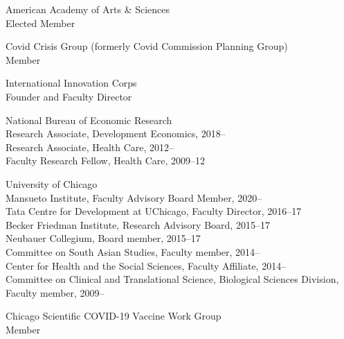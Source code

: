 \documentclass[11pt,letterpaper]{report}
\begin{document}
    \begin{tablist}
    
        \item[2021--]   \tab{}American Academy of Arts \& Sciences \\
                              Elected Member
    
        \item[2021--]   \tab{}Covid Crisis Group (formerly Covid Commission Planning Group) \\
                              Member

        \item[2013--]   \tab{}International Innovation Corps \\
                              Founder and Faculty Director
    
        \item[2009--]   \tab{}National Bureau of Economic Research \\
                              Research Associate, Development Economics, 2018--\\
                              Research Associate, Health Care, 2012--\\
                              Faculty Research Fellow, Health Care, 2009--12
    
        \item[2009--]   \tab{}University of Chicago \\
                              Mansueto Institute, Faculty Advisory Board Member, 2020-- \\
                              Tata Centre for Development at UChicago, Faculty Director, 2016--17 \\
                              Becker Friedman Institute, Research Advisory Board, 2015--17 \\
                              Neubauer Collegium, Board member, 2015--17 \\
                              Committee on South Asian Studies, Faculty member, 2014-- \\
                              Center for Health and the Social Sciences, Faculty Affiliate, 2014-- \\
                              Committee on Clinical and Translational Science, Biological Sciences Division, Faculty member, 2009--
    
        \item[2020]     \tab{}Chicago Scientific COVID-19 Vaccine Work Group \\
        Member


\end{tablist}
\end{document}
